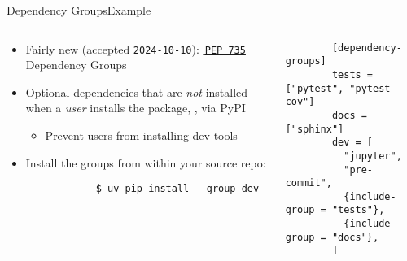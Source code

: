 \begin{splitframe}[fragile]{Dependency Groups}{Example}
  \begin{columns}[t,onlytextwidth]
    \begin{column}{0.58\textwidth}
      \begin{itemize}
        \setlength{\itemsep}{1em}
        \item Fairly new (accepted \texttt{2024-10-10}): \href{https://peps.python.org/pep-0735/}{{\footnotesize{\faExternalLink*}}\,\texttt{PEP 735}} Dependency Groups
        \item Optional dependencies that are \emph{not} installed when a \emph{user} installs the package, \eg, via PyPI
          \begin{itemize}
            \item [\to] Prevent users from installing dev tools
          \end{itemize}
        \item Install the groups from within your source repo:
          \begin{verbatim}
            $ uv pip install --group dev
          \end{verbatim}
      \end{itemize}
    \end{column}
    \hfill
    \begin{column}{0.38\textwidth}
      \begin{verbatim}
        [dependency-groups]
        tests = ["pytest", "pytest-cov"]
        docs = ["sphinx"]
        dev = [
          "jupyter",
          "pre-commit",
          {include-group = "tests"},
          {include-group = "docs"},
        ]
      \end{verbatim}
    \end{column}
  \end{columns}
\end{splitframe}
